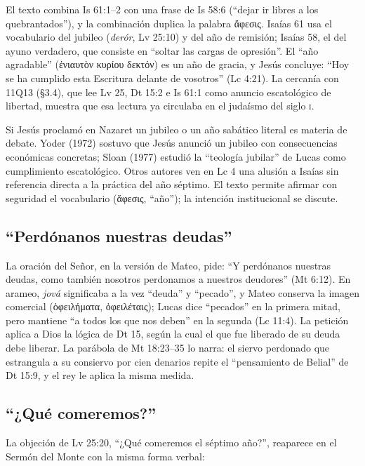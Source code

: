 \documentclass[11pt,letterpaper]{article}
\newcommand{\grc}[1]{\foreignlanguage{ancientgreek}{#1}}
\begin{document}
El texto combina Is 61:1--2 con una frase de Is 58:6 (``dejar ir libres a los quebrantados''), y la combinación duplica la palabra \grc{ἄφεσις}. Isaías 61 usa el vocabulario del jubileo (\emph{derór}, Lv 25:10) y del año de remisión; Isaías 58, el del ayuno verdadero, que consiste en ``soltar las cargas de opresión''. El ``año agradable'' (\grc{ἐνιαυτὸν κυρίου δεκτόν}) es un año de gracia, y Jesús concluye: ``Hoy se ha cumplido esta Escritura delante de vosotros'' (Lc 4:21). La cercanía con 11Q13 (§3.4), que lee Lv 25, Dt 15:2 e Is 61:1 como anuncio escatológico de libertad, muestra que esa lectura ya circulaba en el judaísmo del siglo \textsc{i}.

\begin{nota}[Precisión]
Si Jesús proclamó en Nazaret un jubileo o un año sabático literal es materia de debate. Yoder (1972) sostuvo que Jesús anunció un jubileo con consecuencias económicas concretas; Sloan (1977) estudió la ``teología jubilar'' de Lucas como cumplimiento escatológico. Otros autores ven en Lc 4 una alusión a Isaías sin referencia directa a la práctica del año séptimo. El texto permite afirmar con seguridad el vocabulario (\grc{ἄφεσις}, ``año''); la intención institucional se discute.
\end{nota}

\subsection{``Perdónanos nuestras deudas''}
La oración del Señor, en la versión de Mateo, pide: ``Y perdónanos nuestras deudas, como también nosotros perdonamos a nuestros deudores'' (Mt 6:12). En arameo, \emph{jová} significaba a la vez ``deuda'' y ``pecado'', y Mateo conserva la imagen comercial (\grc{ὀφειλήματα}, \grc{ὀφειλέταις}); Lucas dice ``pecados'' en la primera mitad, pero mantiene ``a todos los que nos deben'' en la segunda (Lc 11:4). La petición aplica a Dios la lógica de Dt 15, según la cual el que fue liberado de su deuda debe liberar. La parábola de Mt 18:23--35 lo narra: el siervo perdonado que estrangula a su consiervo por cien denarios repite el ``pensamiento de Belial'' de Dt 15:9, y el rey le aplica la misma medida.

\subsection{``¿Qué comeremos?''}
La objeción de Lv 25:20, ``¿Qué comeremos el séptimo año?'', reaparece en el Sermón del Monte con la misma forma verbal:
\end{document}
